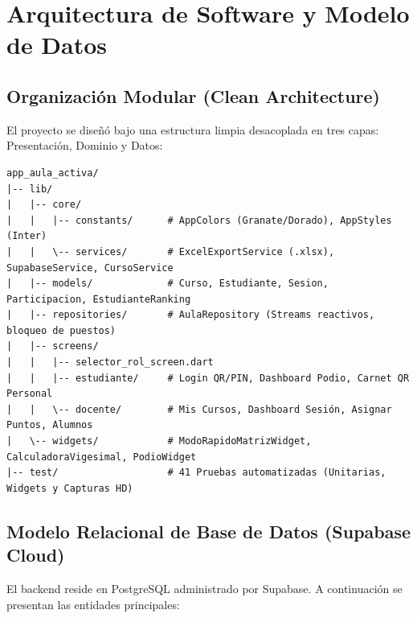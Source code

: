 \documentclass[12pt,a4paper]{article}
\begin{document}
\section{Arquitectura de Software y Modelo de Datos}

\subsection{Organización Modular (Clean Architecture)}
El proyecto se diseñó bajo una estructura limpia desacoplada en tres capas: Presentación, Dominio y Datos:

\begin{verbatim}
app_aula_activa/
|-- lib/
|   |-- core/
|   |   |-- constants/      # AppColors (Granate/Dorado), AppStyles (Inter)
|   |   \-- services/       # ExcelExportService (.xlsx), SupabaseService, CursoService
|   |-- models/             # Curso, Estudiante, Sesion, Participacion, EstudianteRanking
|   |-- repositories/       # AulaRepository (Streams reactivos, bloqueo de puestos)
|   |-- screens/
|   |   |-- selector_rol_screen.dart
|   |   |-- estudiante/     # Login QR/PIN, Dashboard Podio, Carnet QR Personal
|   |   \-- docente/        # Mis Cursos, Dashboard Sesión, Asignar Puntos, Alumnos
|   \-- widgets/            # ModoRapidoMatrizWidget, CalculadoraVigesimal, PodioWidget
|-- test/                   # 41 Pruebas automatizadas (Unitarias, Widgets y Capturas HD)
\end{verbatim}

\subsection{Modelo Relacional de Base de Datos (Supabase Cloud)}
El backend reside en PostgreSQL administrado por Supabase. A continuación se presentan las entidades principales:
\end{document}
